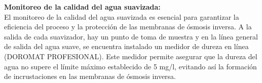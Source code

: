 \textbf{Monitoreo de la calidad del agua suavizada:}\\
El monitoreo de la calidad del agua suavizada es esencial para garantizar la eficiencia del proceso y la protección de las membranas de ósmosis inversa. A la salida de cada suavizador, hay un punto de toma de muestra y en la línea general de salida del agua suave, se encuentra instalado un medidor de dureza en línea (DOROMAT PROFESIONAL). Este medidor permite asegurar que la dureza del agua no supere el límite máximo establecido de 5 mg/l, evitando así la formación de incrustaciones en las membranas de ósmosis inversa.

